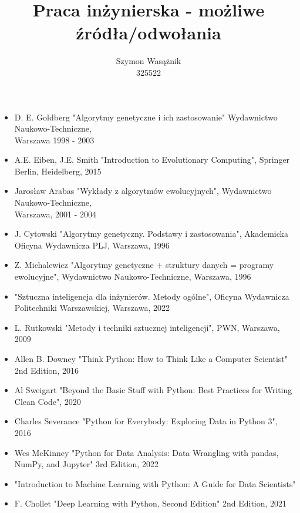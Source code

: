 \documentclass[a4paper, 11pt]{article}
\title{Praca inżynierska - możliwe źródła/odwołania}
\author{Szymon Wasążnik\\325522}
\date{}
\begin{document}
\maketitle

\begin{itemize}
  \setlength{\itemsep}{0pt}
  \setlength{\parskip}{0pt}
  \item D. E. Goldberg "Algorytmy genetyczne i ich zastosowanie" Wydawnictwo Naukowo-Techniczne,\\Warszawa 1998 - 2003
  \item A.E. Eiben, J.E. Smith "Introduction to Evolutionary Computing", Springer Berlin, Heidelberg, 2015
  \item Jarosław Arabas "Wykłady z algorytmów ewolucyjnych", Wydawnictwo Naukowo-Techniczne,\\Warszawa, 2001 - 2004
  \item J. Cytowski "Algorytmy genetyczny. Podstawy i zastosowania", Akademicka Oficyna Wydawnicza PLJ, Warszawa, 1996
  \item Z. Michalewicz "Algorytmy genetyczne + struktury danych = programy ewolucyjne", Wydawnictwo Naukowo-Techniczne, Warszawa, 1996
  \item "Sztuczna inteligencja dla inżynierów. Metody ogólne", Oficyna Wydawnicza Politechniki Warszawskiej, Warszawa, 2022
  \item L. Rutkowski "Metody i techniki sztucznej inteligencji", PWN, Warszawa, 2009
  \item Allen B. Downey "Think Python: How to Think Like a Computer Scientist" 2nd Edition, 2016
  \item Al Sweigart "Beyond the Basic Stuff with Python: Best Practices for Writing Clean Code", 2020
  \item Charles Severance "Python for Everybody: Exploring Data in Python 3", 2016 %
  \item Wes McKinney "Python for Data Analysis: Data Wrangling with pandas, NumPy, and Jupyter" 3rd Edition, 2022
  \item "Introduction to Machine Learning with Python: A Guide for Data Scientists"
  \item F. Chollet "Deep Learning with Python, Second Edition" 2nd Edition, 2021

\end{itemize}
\end{document}

